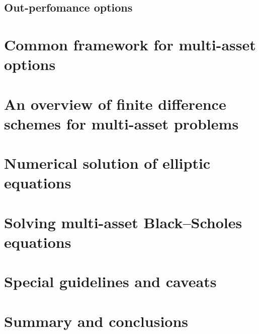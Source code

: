 \subsection{Out-perfomance options}

\section{Common framework for multi-asset options}

\section{An overview of finite difference schemes for multi-asset problems}

\section{Numerical solution of elliptic equations}

\section{Solving multi-asset Black–Scholes equations}

\section{Special guidelines and caveats}

\section{Summary and conclusions}
